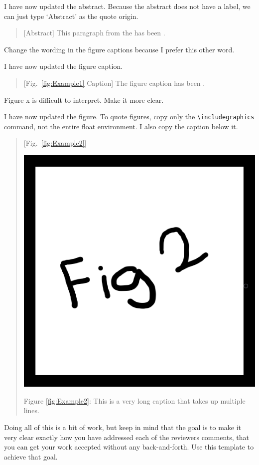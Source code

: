 \documentclass{AuthorResponse}
\newcommand{\figref}[1]{Fig.~\ref{#1}}
\begin{document}
I have now updated the abstract. Because the abstract does not have a label, we can just type `Abstract' as the quote origin.

\begin{quote}[Abstract]
	This paragraph from the   has been  .
\end{quote}


\RC Change the wording in the figure captions because I prefer this other word.

I have now updated the figure caption.

\begin{quote}[\figref{fig:Example1} Caption]
	The figure caption has been  .
\end{quote}


\RC Figure x is difficult to interpret. Make it more clear.

I have now updated the figure. To quote figures, copy only the \verb|\includegraphics| command, not the entire float environment. I also copy the caption below it.

\begin{quote}[\figref{fig:Example2}]
	\centerline{\includegraphics[width=0.5\columnwidth,keepaspectratio]{Figures/ExampleFigure2.png}}
	Figure \ref{fig:Example2}: This is a very long caption that takes up multiple lines.
\end{quote}

Doing all of this is a bit of work, but keep in mind that the goal is to make it very clear exactly how you have addressed each of the reviewers comments, that you can get your work accepted without any back-and-forth. Use this template to achieve that goal.


\end{document}
